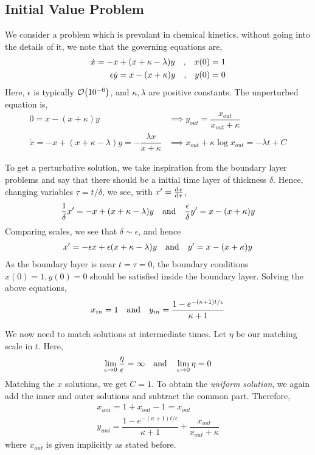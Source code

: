 \documentclass[a4paper,11pt]{article}
\begin{document}
\subsection{Initial Value Problem}
We consider a problem which is prevalant in chemical kinetics. without going into the details of it, we note that the governing equations are,
\begin{align*}
\dot{x}=-x + (x + \kappa - \lambda )y \qq{,} x(0)=1\\
\epsilon \dot{y} = x - (x + \kappa )y \qq{,} y(0)=0
\end{align*}
Here, $ \epsilon $ is typically $ \order{10^{-6}} $, and $ \kappa, \lambda $ are positive constants. The unperturbed equation is,
\begin{align*}
0 = x - (x + \kappa )y  &\implies y_{out} = \dfrac{x_{out}}{x_{out}+ \kappa}\\
\dot{x}=-x + (x + \kappa - \lambda )y = -\dfrac{\lambda x}{x + \kappa} &\implies x_{out} + \kappa \log x_{out} = - \lambda t + C 
\end{align*}

To get a perturbative solution, we take inspiration from the boundary layer problems and say that there should be a initial time layer of thickness $ \delta $. Hence, changing variables $ \tau = t/\delta $, we see, with $ x' = \dv{x}{\tau} $,
\begin{equation*}
\dfrac{1}{\delta} x' = -x + (x + \kappa - \lambda )y \qq{and} \dfrac{\epsilon}{\delta} y' = x - (x + \kappa) y  
\end{equation*}
Comparing scales, we see that $ \delta \sim \epsilon $, and hence
\begin{align*}
 x' = -\epsilon x + \epsilon (x + \kappa - \lambda )y \qq{and} y' = x - (x + \kappa) y  
\end{align*}
As the boundary layer is near $ t = \tau = 0 $, the boundary conditions $ x(0)=1, y(0)=0  $ should be satisfied inside the boundary layer. Solving the above equations,
\begin{equation*}
x_{in } =1 \qq{and} y_{in} = \dfrac{1 - e^{- (\kappa + 1) t/\epsilon}}{\kappa + 1}
\end{equation*}

We now need to match solutions at intermediate times. Let $ \eta  $ be our matching scale in $ t $. Here,
\begin{equation*}
\lim\limits_{\epsilon \rightarrow 0} \dfrac{\eta}{\epsilon} = \infty \qq{and} \lim\limits_{\epsilon \rightarrow 0} \eta = 0
\end{equation*}
Matching the $ x$ solutions, we get $ C=1 $. To obtain the \textit{uniform solution}, we again add the inner and outer solutions and subtract the common part. Therefore,
\begin{align*}
x_{uni} = 1 + x_{out} -1 = x_{out} \\
y_{uni} = \dfrac{1 - e^{- (\kappa + 1) t/\epsilon}}{\kappa + 1} + \dfrac{x_{out}}{x_{out} + \kappa}
\end{align*}
where $ x_{out} $ is given implicitly as stated before.
\end{document}
